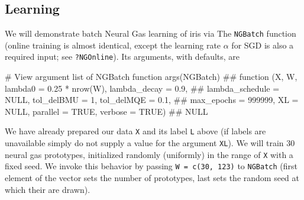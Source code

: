 \documentclass[11pt,]{article}
\newenvironment{Shaded}{}{}
\newcommand{\CommentTok}[1]{\textcolor[rgb]{0.00,0.50,0.00}{#1}}
\newcommand{\DecValTok}[1]{#1}
\newcommand{\KeywordTok}[1]{\textcolor[rgb]{0.00,0.00,1.00}{#1}}
\newcommand{\NormalTok}[1]{#1}
\newcommand{\OperatorTok}[1]{#1}
\newcommand{\StringTok}[1]{\textcolor[rgb]{0.00,0.50,0.50}{#1}}
\begin{document}
\begin{Shaded}
\end{Shaded}

\hypertarget{learning}{%
\subsection{Learning}\label{learning}}

We will demonstrate batch Neural Gas learning of iris via The
\texttt{NGBatch} function (online training is almost identical, except
the learning rate \(\alpha\) for SGD is also a required input; see
\texttt{?NGOnline}). Its arguments, with defaults, are

\begin{Shaded}
\begin{Highlighting}[]
\CommentTok{# View argument list of NGBatch function }
\KeywordTok{args}\NormalTok{(NGBatch)}
\CommentTok{## function (X, W, lambda0 = 0.25 * nrow(W), lambda_decay = 0.9, }
\CommentTok{##     lambda_schedule = NULL, tol_delBMU = 1, tol_delMQE = 0.1, }
\CommentTok{##     max_epochs = 999999, XL = NULL, parallel = TRUE, verbose = TRUE) }
\CommentTok{## NULL}
\end{Highlighting}
\end{Shaded}

We have already prepared our data \texttt{X} and its label \texttt{L}
above (if labels are unavailable simply do not supply a value for the
argument \texttt{XL}). We will train 30 neural gas prototypes,
initialized randomly (uniformly) in the range of \texttt{X} with a fixed
seed. We invoke this behavior by passing \texttt{W\ =\ c(30,\ 123)} to
\texttt{NGBatch} (first element of the vector sets the number of
prototypes, last sets the random seed at which their are drawn).
\end{document}
